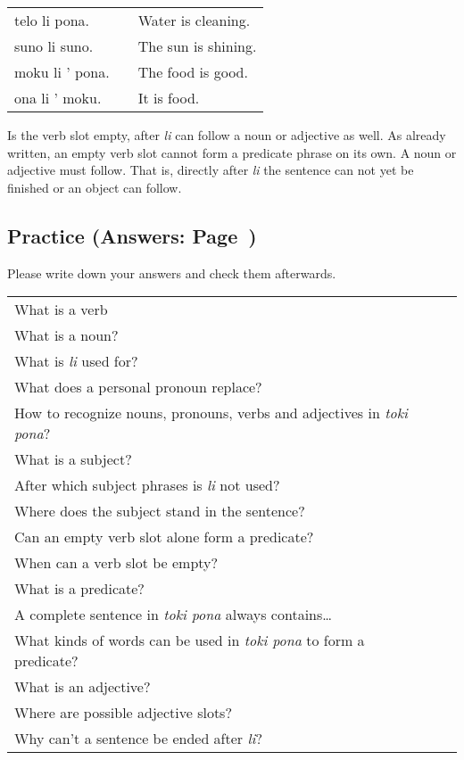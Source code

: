 \begin{supertabular}{p{5cm}|ll}
telo li pona. && Water is cleaning. \\
suno li suno. && The sun is shining. \\
moku li ' pona. && The food is good. \\ 
ona li ' moku. && It is food. \\
\end{supertabular} 

Is the verb slot empty, after \textit{li} can follow a noun or adjective as well. 
As already written, an empty verb slot cannot form a predicate phrase on its own. 
A noun or adjective must follow. 
That is, directly after \textit{li} the sentence can not yet be finished or an object can follow.
%
\newpage
\subsection*{Practice (Answers: Page~\pageref{'basic_sentences'})}
%
Please write down your answers and check them afterwards. 

\begin{supertabular}{p{5,5cm}|ll}
What is a verb &&  \\ %
What is a noun? &&   \\ %
What is \textit{li} used for?  &&   \\ %
What does a personal pronoun replace? &&  \\ %
How to recognize nouns, pronouns, verbs and adjectives in \textit{toki pona}? &&  \\ %
What is a subject?  &&   \\ %
After which subject phrases is \textit{li} not used?  &&  \\ %
Where does the subject stand in the sentence?  &&    \\ %
Can an empty verb slot alone form a predicate? &&    \\ %
When can a verb slot be empty?  &&     \\ %
What is a predicate?  &&     \\ %
A complete sentence in \textit{toki pona} always contains\dots  &&     \\ %
What kinds of words can be used in \textit{toki pona} to form a predicate? &&   \\ %
What is an adjective?  &&    \\ %
Where are possible adjective slots?  &&    \\  %
Why can't a sentence be ended after \textit{li}? &&  \\ %
\end{supertabular} 

